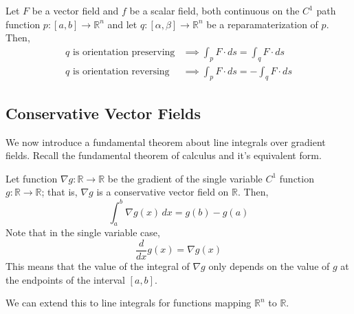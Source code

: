   \begin{theorem}
		Let $F$ be a vector field and $f$ be a scalar field, both continuous on the $C^1$ path function $p: [a,b] \longrightarrow \mathbb{R}^n$ and let $q: [\alpha, \beta] \longrightarrow \mathbb{R}^n$ be a reparamaterization of $p$. Then, 
		\begin{align*}
			q \text{ is orientation preserving} & \implies \int_p F \cdot d s = \int_q F \cdot d s \\
			q \text{ is orientation reversing} & \implies \int_p F \cdot d s = - \int_q F \cdot d s
		\end{align*}
  \end{theorem}

\subsection{Conservative Vector Fields}

  We now introduce a fundamental theorem about line integrals over gradient fields. Recall the fundamental theorem of calculus and it's equivalent form. 

  \begin{theorem}
		Let function $\nabla g: \mathbb{R} \longrightarrow \mathbb{R}$ be the gradient of the single variable $C^1$ function $g: \mathbb{R} \longrightarrow \mathbb{R}$; that is, $\nabla g$ is a conservative vector field on $\mathbb{R}$. Then, 
		\begin{equation}
			\int_a^b \nabla g (x) \,dx = g(b) - g(a)
		\end{equation}
		Note that in the single variable case, 
		\begin{equation}
			\frac{d}{dx} g(x) = \nabla g(x)
		\end{equation}
		This means that the value of the integral of $\nabla g$ only depends on the value of $g$ at the endpoints of the interval $[a,b]$. 
  \end{theorem}

  We can extend this to line integrals for functions mapping $\mathbb{R}^n$ to $\mathbb{R}$. 

